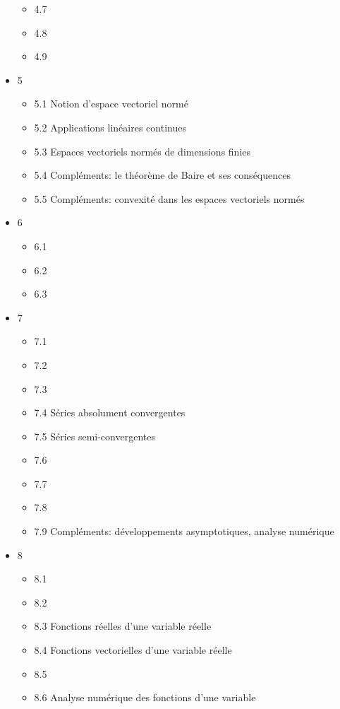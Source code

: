 \documentclass{article}
\begin{document}
\begin{itemize}
\begin{itemize}
      \item 4.7
      \item 4.8
      \item 4.9
    \end{itemize}
  \item 5
    \begin{itemize}
      \item 5.1 Notion d'espace vectoriel normé
      \item 5.2 Applications linéaires continues
      \item 5.3 Espaces vectoriels normés de dimensions finies
      \item 5.4 Compléments: le théorème de Baire et ses conséquences
      \item 5.5 Compléments: convexité dans les espaces vectoriels normés
    \end{itemize}
  \item 6
    \begin{itemize}
      \item 6.1
      \item 6.2
      \item 6.3
    \end{itemize}
  \item 7
    \begin{itemize}
      \item 7.1
      \item 7.2
      \item 7.3
      \item 7.4 Séries absolument convergentes
      \item 7.5 Séries semi-convergentes
      \item 7.6
      \item 7.7
      \item 7.8
      \item 7.9 Compléments: développements asymptotiques, analyse numérique
    \end{itemize}
  \item 8
    \begin{itemize}
      \item 8.1
      \item 8.2
      \item 8.3 Fonctions réelles d'une variable réelle
      \item 8.4 Fonctions vectorielles d'une variable réelle
      \item 8.5
      \item 8.6 Analyse numérique des fonctions d'une variable

\end{itemize}
\end{itemize}
\end{document}
